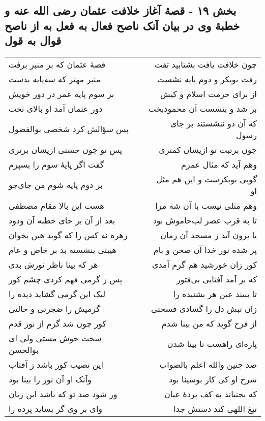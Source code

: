 \begin{center}
\section*{بخش ۱۹ - قصهٔ آغاز خلافت عثمان رضی الله  عنه و خطبهٔ وی در بیان آنک ناصح  فعال به فعل به از ناصح قوال به قول}
\label{sec:sh019}
\begin{longtable}{l p{0.5cm} r}
قصهٔ عثمان که بر منبر برفت
&&
چون خلافت یافت بشتابید تفت
\\
منبر مهتر که سه‌پایه بدست
&&
رفت بوبکر و دوم پایه نشست
\\
بر سوم پایه عمر در دور خویش
&&
از برای حرمت اسلام و کیش
\\
دور عثمان آمد او بالای تخت
&&
بر شد و بنشست آن محمودبخت
\\
پس سؤالش کرد شخصی بوالفضول
&&
که آن دو ننشستند بر جای رسول
\\
پس تو چون جستی ازیشان برتری
&&
چون برتبت تو ازیشان کمتری
\\
گفت اگر پایهٔ سوم را بسپرم
&&
وهم آید که مثال عمرم
\\
بر دوم پایه شوم من جای‌جو
&&
گویی بوبکرست و این هم مثل او
\\
هست این بالا مقام مصطفی
&&
وهم مثلی نیست با آن شه مرا
\\
بعد از آن بر جای خطبه آن ودود
&&
تا به قرب عصر لب‌خاموش بود
\\
زهره نه کس را که گوید هین بخوان
&&
یا برون آید ز مسجد آن زمان
\\
هیبتی بنشسته بد بر خاص و عام
&&
پر شده نور خدا آن صحن و بام
\\
هر که بینا ناظر نورش بدی
&&
کور زان خورشید هم گرم آمدی
\\
پس ز گرمی فهم کردی چشم کور
&&
که بر آمد آفتابی بی‌فتور
\\
لیک این گرمی گشاید دیده را
&&
تا ببیند عین هر بشنیده را
\\
گرمیش را ضجرتی و حالتی
&&
زان تبش دل را گشادی فسحتی
\\
کور چون شد گرم از نور قدم
&&
از فرح گوید که من بینا شدم
\\
سخت خوش مستی ولی ای بوالحسن
&&
پاره‌ای راهست تا بینا شدن
\\
این نصیب کور باشد ز آفتاب
&&
صد چنین والله اعلم بالصواب
\\
وآنک او آن نور را بینا بود
&&
شرح او کی کار بوسینا بود
\\
ور شود صد تو که باشد این زبان
&&
که بجنباند به کف پردهٔ عیان
\\
وای بر وی گر بساید پرده را
&&
تیغ اللهی کند دستش جدا

\end{longtable}
\end{center}
